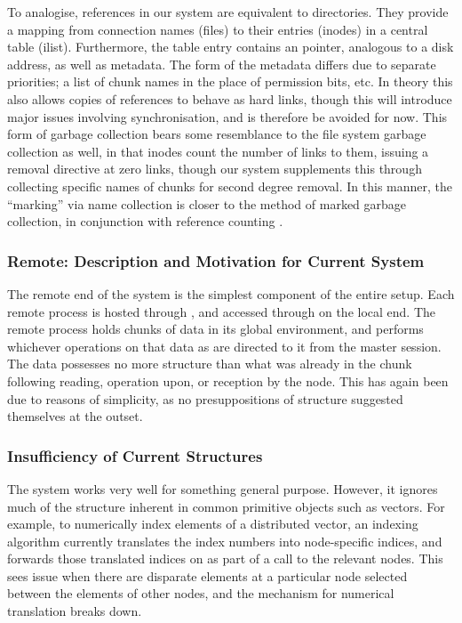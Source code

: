 To analogise, references in our system are equivalent to directories.
They provide a mapping from connection names (files) to their entries (inodes) in a central table (ilist).
Furthermore, the table entry contains an  pointer, analogous to a disk address, as well as metadata.
The form of the metadata differs due to separate priorities; a list of chunk names in the place of permission bits, etc. In theory this also allows copies of references to behave as hard links, though this will introduce major issues involving synchronisation, and is therefore be avoided for now.
This form of garbage collection bears some resemblance to the file system garbage collection as well, in that inodes count the number of links to them, issuing a removal directive at zero links, though our system supplements this through collecting specific names of chunks for second degree removal.
In this manner, the ``marking'' via name collection is closer to the method of marked garbage collection, in conjunction with reference counting \cite{knuth1}.

\subsubsection{Remote: Description and Motivation for Current System}\label{description-and-motivation-for-current-system}

The remote end of the system is the simplest component of the entire setup.
Each remote \R{} process is hosted through , and accessed through  on the local end.
The remote \R{} process holds chunks of data in its global environment, and performs whichever operations on that data as are directed to it from the master \R{} session.
The data possesses no more structure than what was already in the chunk following reading, operation upon, or reception by the node.
This has again been due to reasons of simplicity, as no presuppositions of structure suggested themselves at the outset.

\subsubsection{Insufficiency of Current Structures}\label{insufficiency-of-current-structures-1}

The system works very well for something general purpose.
However, it ignores much of the structure inherent in common primitive \R{} objects such as vectors.
For example, to numerically index elements of a distributed vector, an indexing algorithm currently translates the index numbers into node-specific indices, and forwards those translated indices on as part of a call to the relevant nodes.
This sees issue when there are disparate elements at a particular node selected between the elements of other nodes, and the mechanism for numerical translation breaks down.

